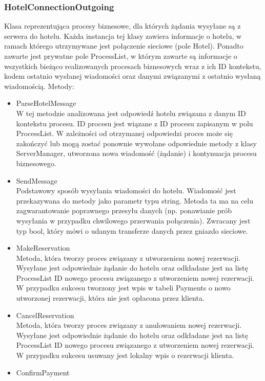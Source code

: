 \documentclass{article}
\begin{document}
\subsubsection{HotelConnectionOutgoing}
Klasa reprezentująca procesy biznesowe, dla których żądania wysyłane są z serwera do hotelu. Każda instancja tej klasy zawiera informacje o hotelu, w ramach którego utrzymywane jest połączenie sieciowe (pole Hotel). Ponadto zawarte jest prywatne pole ProcessList, w którym zawarte są informacje o wszystkich bieżąco realizowanych procesach biznesowych wraz z ich ID kontekstu, kodem ostatnio wysłanej wiadomości oraz danymi związanymi z ostatnio wysłaną wiadomością. Metody:
\begin{itemize}
    \item ParseHotelMessage\\
    W tej metodzie analizowana jest odpowiedź hotelu związana z danym ID kontekstu procesu. ID procesu jest wiązane z ID procesu zapisanym w polu ProcessList. W zależności od otrzymanej odpowiedzi proces może się zakończyć lub mogą zostać ponownie wywołane odpowiednie metody z klasy ServerManager, utworzona nowa wiadomość (żądanie) i kontynuacja procesu biznesowego.
    \item SendMessage\\
    Podstawowy sposób wysyłania wiadomości do hotelu. Wiadomość jest przekazywana do metody jako parametr typu string. Metoda ta ma na celu zagwarantowanie poprawnego przesyłu danych (np. ponawianie prób wysyłania w przypadku chwilowego przerwania połączenia). Zwracany jest typ bool, który mówi o udanym transferze danych przez gniazdo sieciowe.
    \item MakeReservation\\
    Metoda, która tworzy proces związany z utworzeniem nowej rezerwacji. Wysyłane jest odpowiednie żądanie do hotelu oraz odkładane jest na listę ProcessList ID nowego procesu związanego z utworzeniem nowej rezerwacji. W przypadku sukcesu tworzony jest wpis w tabeli Payments o nowo utworzonej rezerwacji, która nie jest opłacona przez klienta.
    \item CancelReservation\\
    Metoda, która tworzy proces związany z anulowaniem nowej rezerwacji. Wysyłane jest odpowiednie żądanie do hotelu oraz odkładane jest na listę ProcessList ID nowego procesu związanego z utworzeniem nowej rezerwacji. W przypadku sukcesu usuwany jest lokalny wpis o rezerwacji klienta.
    \item ConfirmPayment\\

\end{itemize}
\end{document}
